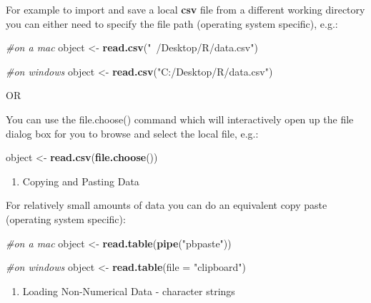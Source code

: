 \documentclass[]{book}
\newenvironment{Shaded}{\begin{snugshade}}{\end{snugshade}}
\newcommand{\CommentTok}[1]{\textcolor[rgb]{0.56,0.35,0.01}{\textit{#1}}}
\newcommand{\DataTypeTok}[1]{\textcolor[rgb]{0.13,0.29,0.53}{#1}}
\newcommand{\KeywordTok}[1]{\textcolor[rgb]{0.13,0.29,0.53}{\textbf{#1}}}
\newcommand{\NormalTok}[1]{#1}
\newcommand{\StringTok}[1]{\textcolor[rgb]{0.31,0.60,0.02}{#1}}
\providecommand{\tightlist}{%
  \setlength{\itemsep}{0pt}\setlength{\parskip}{0pt}}
\begin{document}
For example to import and save a local \textbf{csv} file from a different working directory you can either need to specify the file path (operating system specific), e.g.:

\begin{Shaded}
\begin{Highlighting}[]
\CommentTok{#on a mac}
\NormalTok{object <-}\StringTok{ }\KeywordTok{read.csv}\NormalTok{(}\StringTok{"~/Desktop/R/data.csv"}\NormalTok{)}

\CommentTok{#on windows}
\NormalTok{object <-}\StringTok{ }\KeywordTok{read.csv}\NormalTok{(}\StringTok{"C:/Desktop/R/data.csv"}\NormalTok{)}
\end{Highlighting}
\end{Shaded}

OR

You can use the file.choose() command which will interactively open up the file dialog box for you to browse and select the local file, e.g.:

\begin{Shaded}
\begin{Highlighting}[]
\NormalTok{object <-}\StringTok{ }\KeywordTok{read.csv}\NormalTok{(}\KeywordTok{file.choose}\NormalTok{())}
\end{Highlighting}
\end{Shaded}

\begin{enumerate}
\def\labelenumi{(\alph{enumi})}
\setcounter{enumi}{2}
\tightlist
\item
  Copying and Pasting Data
\end{enumerate}

For relatively small amounts of data you can do an equivalent copy paste (operating system specific):

\begin{Shaded}
\begin{Highlighting}[]
\CommentTok{#on a mac}
\NormalTok{object <-}\StringTok{ }\KeywordTok{read.table}\NormalTok{(}\KeywordTok{pipe}\NormalTok{(}\StringTok{"pbpaste"}\NormalTok{))}

\CommentTok{#on windows}
\NormalTok{object <-}\StringTok{ }\KeywordTok{read.table}\NormalTok{(}\DataTypeTok{file =} \StringTok{"clipboard"}\NormalTok{)}
\end{Highlighting}
\end{Shaded}

\begin{enumerate}
\def\labelenumi{\arabic{enumi}.}
\setcounter{enumi}{1}
\tightlist
\item
  Loading Non-Numerical Data - character strings
\end{enumerate}
\end{document}
